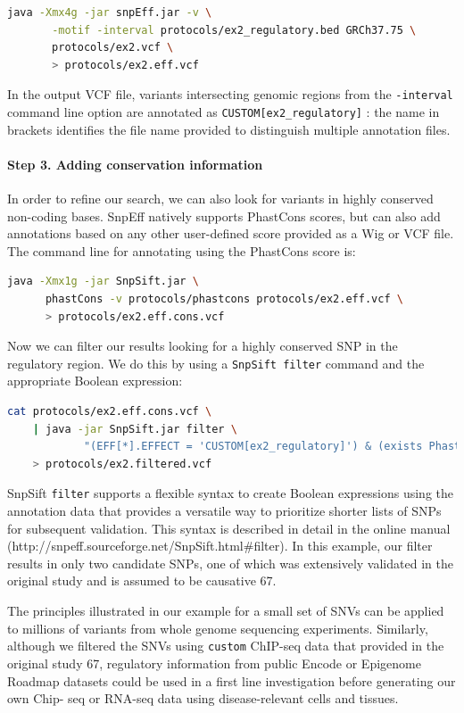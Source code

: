 \begin{lstlisting}[language=bash]
java -Xmx4g -jar snpEff.jar -v \
       -motif -interval protocols/ex2_regulatory.bed GRCh37.75 \
       protocols/ex2.vcf \
       > protocols/ex2.eff.vcf
\end{lstlisting}

In the output VCF file, variants intersecting genomic regions from the \texttt{-interval} command line option are annotated as \texttt{CUSTOM[ex2\_regulatory]} : the name in brackets identifies the file name provided to distinguish multiple annotation files.

\paragraph{Step 3. Adding conservation information} In order to refine our search, we can also look for variants in highly conserved non-coding bases. SnpEff natively supports PhastCons scores, but can also add annotations based on any other user-defined score provided as a Wig or VCF file. The command line for annotating using the PhastCons score is:

\begin{lstlisting}[language=bash]
java -Xmx1g -jar SnpSift.jar \
      phastCons -v protocols/phastcons protocols/ex2.eff.vcf \
      > protocols/ex2.eff.cons.vcf
\end{lstlisting}

Now we can filter our results looking for a highly conserved SNP in the regulatory region. We do this by using a \texttt{SnpSift filter} command and the appropriate Boolean expression:

\begin{lstlisting}[language=bash]
cat protocols/ex2.eff.cons.vcf \
    | java -jar SnpSift.jar filter \
            "(EFF[*].EFFECT = 'CUSTOM[ex2_regulatory]') & (exists PhastCons) & (PhastC ons > 0.9)" \
    > protocols/ex2.filtered.vcf
\end{lstlisting}

SnpSift \texttt{filter} supports a flexible syntax to create Boolean expressions using the annotation data that provides a versatile way to prioritize shorter lists of SNPs for subsequent validation. This syntax is described in detail in the online manual (http://snpeff.sourceforge.net/SnpSift.html\#filter). In this example, our filter results in only two candidate SNPs, one of which was extensively validated in the original study and is assumed to be causative 67.

The principles illustrated in our example for a small set of SNVs can be applied to millions of variants from whole genome sequencing experiments. Similarly, although we filtered the SNVs using \texttt{custom} ChIP-seq data that provided in the original study 67, regulatory information from public Encode or Epigenome Roadmap datasets could be used in a first line investigation before generating our own Chip- seq or RNA-seq data using disease-relevant cells and tissues.

